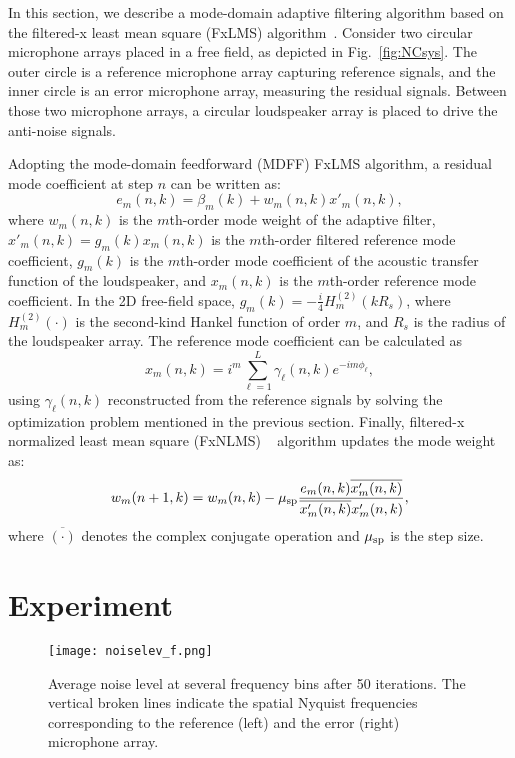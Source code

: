 \documentclass{article}
\begin{document}
In this section, we describe a mode-domain adaptive filtering algorithm
based on the filtered-x least mean square (FxLMS) algorithm~\cite{burgess1981active}.
Consider two circular microphone arrays placed in a free field, as depicted in Fig.~\ref{fig:NCsys}.
The outer circle is a reference microphone array capturing reference signals,
and the inner circle is an error microphone array, measuring the residual signals.
Between those two microphone arrays, a circular loudspeaker array is placed to
drive the anti-noise signals.

Adopting the mode-domain feedforward (MDFF) FxLMS algorithm,
a residual mode coefficient at step $n$ can be written as:
%
\begin{equation}
e_m(n, k) = \beta_m(k) + w_m(n, k) x'_m(n, k) ,
\label{eq:FxLMS}
\end{equation}
%
where $w_m(n, k)$ is the $m$th-order mode weight of the adaptive filter, $x'_m(n, k) = g_m(k) x_m(n, k)$ is the
$m$th-order filtered reference mode coefficient, $g_m(k)$ is the $m$th-order mode coefficient of the acoustic transfer function
of the loudspeaker, and $x_m(n, k)$ is the $m$th-order reference mode coefficient.
In the 2D free-field space, $g_m(k) = -\frac{i}{4} H_m^{(2)}(kR_s)$, where $H_m^{(2)}(\cdot)$ is the second-kind Hankel function of order $m$, and $R_s$ is the radius of the loudspeaker array. 
The reference mode coefficient can be calculated as
%
\begin{equation}
x_m(n, k) = i^m \sum^{L}_{\ell=1} \gamma_\ell(n, k) e^{-im \phi_\ell} ,
\label{eq:ref}
\end{equation}
%
using $\gamma_\ell(n, k)$ reconstructed from the reference signals by solving the optimization
problem mentioned in the previous section.
Finally, filtered-x normalized least mean square (FxNLMS)
~\cite{slock1993convergence} algorithm updates the mode weight as:
%
\begin{equation}
w_m(n+1, k) = w_m(n, k) - \mu_{\rm sp} \frac{e_m(n, k) \overline{x'_m(n, k)}}{\overline{x'_m(n, k)} x'_m(n, k)} ,
\label{eq:update}
\end{equation}
%
where $\overline{(\cdot)}$ denotes the complex conjugate operation and $\mu_{\rm sp}$ is the step size.


%
\section{Experiment}
\label{sec:exp}

%
\begin{figure}[t]
\vspace*{-10pt}
  \centering
  \centerline{\texttt{[image: noiselev\_f.png]}}
\caption{Average noise level at several frequency bins after 50 iterations. The vertical broken lines indicate the spatial Nyquist frequencies corresponding to the reference (left) and the error (right) microphone array.}
\label{fig:NoiseLevel}
\vspace{-3pt}
\end{figure}
%
\end{document}
